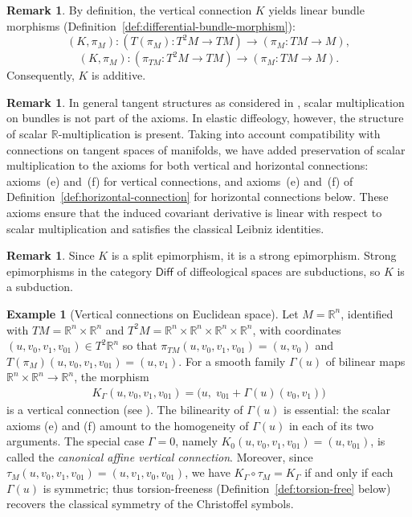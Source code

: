 \documentclass{amsart}
\newcommand{\R}{\mathbb{R}}
\theoremstyle{definition}
\newtheorem{rem}[thm]{Remark}
\newtheorem{ex}[thm]{Example}
\begin{document}
\begin{rem}\label{rem:K-linear-bundle}
  By definition, the vertical connection $K$ yields linear bundle morphisms
  (Definition~\ref{def:differential-bundle-morphism}):
  \[
    (K, \pi_M) \colon (T(\pi_M) \colon T^2M \to TM) \to (\pi_M \colon TM \to M),
  \]
  \[
    (K, \pi_M) \colon (\pi_{TM} \colon T^2M \to TM) \to (\pi_M \colon TM \to M).
  \]
  Consequently, $K$ is additive.
\end{rem}

\begin{rem}\label{rem:scalar-axiom}
  In general tangent structures as considered in \cite{CC14, CC15, CC17},
  scalar multiplication on bundles is not part of the axioms.
  In elastic diffeology, however, the structure of scalar $\R$-multiplication
  is present. Taking into account compatibility with connections on tangent spaces
  of manifolds, we have added preservation of scalar multiplication to the axioms
  for both vertical and horizontal connections: axioms~(e) and~(f) for vertical connections,
  and axioms~(e) and~(f) of Definition~\ref{def:horizontal-connection} for
  horizontal connections below. These axioms ensure that the induced covariant derivative
  is linear with respect to scalar multiplication and satisfies the classical Leibniz identities.
\end{rem}

\begin{rem}\label{rem:K-subduction}
  Since $K$ is a split epimorphism, it is a strong epimorphism.
  Strong epimorphisms in the category $\mathsf{Diff}$ of diffeological spaces
  are subductions, so $K$ is a subduction.
\end{rem}

\begin{ex}[Vertical connections on Euclidean space]\label{ex:euclidean-vertical-connection}
Let $M = \R^n$, identified with $TM = \R^n \times \R^n$ and
$T^2M = \R^n \times \R^n \times \R^n \times \R^n$, with coordinates
$(u, v_0, v_1, v_{01}) \in T^2\R^n$ so that
$\pi_{TM}(u, v_0, v_1, v_{01}) = (u, v_0)$ and
$T(\pi_M)(u, v_0, v_1, v_{01}) = (u, v_1)$.
For a smooth family $\Gamma(u)$ of bilinear maps
$\R^n \times \R^n \to \R^n$, the morphism
\begin{align*}
    K_\Gamma(u, v_0, v_1, v_{01}) = \bigl(u,\; v_{01} + \Gamma(u)(v_0, v_1)\bigr)
\end{align*}
is a vertical connection (see \cite[Example~3.6]{CC17}). The bilinearity of
$\Gamma(u)$ is essential: the scalar axioms (e) and (f) amount to the
homogeneity of $\Gamma(u)$ in each of its two arguments.
The special case $\Gamma = 0$, namely
$K_0(u, v_0, v_1, v_{01}) = (u, v_{01})$, is called the
\emph{canonical affine vertical connection}.
Moreover, since $\tau_M(u, v_0, v_1, v_{01}) = (u, v_1, v_0, v_{01})$, we have
$K_\Gamma \circ \tau_M = K_\Gamma$ if and only if each $\Gamma(u)$ is
symmetric; thus torsion-freeness (Definition~\ref{def:torsion-free} below)
recovers the classical symmetry of the Christoffel symbols.
\end{ex}
\end{document}
